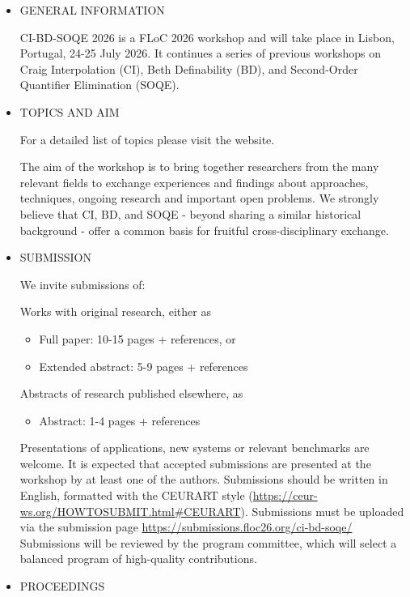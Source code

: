 \documentclass[prodmode,acmtecs]{acmsmall} %
\begin{document}
\begin{itemize}\item  GENERAL INFORMATION 
 
  CI-BD-SOQE 2026 is a FLoC 2026 workshop and will take place in Lisbon, Portugal, 24-25 July 2026. It continues a series of previous workshops on Craig Interpolation (CI), Beth Definability (BD), and Second-Order Quantifier Elimination (SOQE). 
 
\item  TOPICS AND AIM 
 
  For a detailed list of topics please visit the website. 
 
  The aim of the workshop is to bring together researchers from the many relevant fields to exchange experiences and findings about approaches, techniques, ongoing research and important open problems. We strongly believe that CI, BD, and SOQE - beyond sharing a similar historical background - offer a common basis for fruitful cross-disciplinary exchange. 
 
\item  SUBMISSION 
 
  We invite submissions of: 
 
  Works with original research, either as 
 
\begin{itemize}\item  Full paper: 10-15 pages + references, or
\item  Extended abstract: 5-9 pages + references
\end{itemize} 
  Abstracts of research published elsewhere, as 
 
\begin{itemize}\item  Abstract: 1-4 pages + references
\end{itemize} 
  Presentations of applications, new systems or relevant benchmarks are welcome. It is expected that accepted submissions are presented at the workshop by at least one of the authors. Submissions should be written in English, formatted with the CEURART style (\href{https://ceur-ws.org/HOWTOSUBMIT.html#CEURART}{https://ceur-ws.org/HOWTOSUBMIT.html\#CEURART}). Submissions must be uploaded via the submission page \href{https://submissions.floc26.org/ci-bd-soqe/}{https://submissions.floc26.org/ci-bd-soqe/}  Submissions will be reviewed by the program committee, which will select a balanced program of high-quality contributions. 
 
\item  PROCEEDINGS 
 

\end{itemize}
\end{document}
